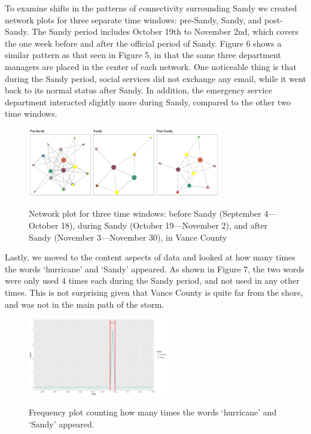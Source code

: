 \documentclass[a4paper]{article}
\begin{document}
To examine shifts in the patterns of connectivity surrounding Sandy we created network plots for three separate time windows: pre-Sandy, Sandy, and post-Sandy. The Sandy period includes October 19th to November 2nd, which covers the one week before and after the official period of Sandy. Figure 6 shows a similar pattern as that seen in Figure 5, in that the same three department managers are placed in the center of each network. One noticeable thing is that during the Sandy period, social services did not exchange any email, while it went back to its normal status after Sandy. In addition, the emergency service department interacted slightly more during Sandy, compared to the other two time windows.
   \begin{figure}[ht]
   	\centering
   	\includegraphics[width=0.75\textwidth]{plots/VanceNetwork-1.png}  
   	\label{fig:NetworkVance}
   	\caption{Network plot for three time windows: before Sandy (September 4---October 18), during Sandy (October 19---November 2), and after Sandy (November 3---November 30), in Vance County}
   \end{figure}
   
   Lastly, we moved to the content aspects of data and looked at how many times the words `hurricane' and `Sandy' appeared. As shown in Figure 7, the two words were only used 4 times each during the Sandy period, and not used in any other times. This is not surprising given that Vance County is quite far from the shore, and was not in the main path of the storm.
      \begin{figure}[ht]
      	\centering
      	\includegraphics[width=0.55\textwidth]{plots/VanceWord-1.png}  
      	\label{fig:WordVance}
      	\caption{Frequency plot counting how many times the words `hurricane' and `Sandy' appeared.}
      \end{figure}
      \newpage
\end{document}
